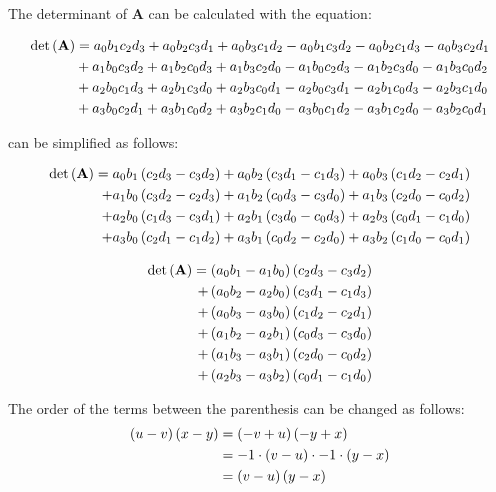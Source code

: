 The determinant of $\mathbf{A}$ can be calculated with the equation:

\begin{align}
\mathrm{det}\left(\mathbf{A}\right)
&
= a_0b_1c_2d_3 
+ a_0b_2c_3d_1 
+ a_0b_3c_1d_2
- a_0b_1c_3d_2
- a_0b_2c_1d_3 
- a_0b_3c_2d_1\nonumber\\
&
+ a_1b_0c_3d_2
+ a_1b_2c_0d_3
+ a_1b_3c_2d_0
- a_1b_0c_2d_3
- a_1b_2c_3d_0
- a_1b_3c_0d_2\nonumber\\
&
+ a_2b_0c_1d_3
+ a_2b_1c_3d_0
+ a_2b_3c_0d_1
- a_2b_0c_3d_1
- a_2b_1c_0d_3
- a_2b_3c_1d_0\nonumber\\
&
+ a_3b_0c_2d_1
+ a_3b_1c_0d_2
+ a_3b_2c_1d_0
- a_3b_0c_1d_2
- a_3b_1c_2d_0
- a_3b_2c_0d_1\label{eq:determinant4x4}
\end{align}

 can be simplified as follows:

\begin{align*}
\mathrm{det}\left(\mathbf{A}\right)
= a_0b_1 \left(c_2d_3 - c_3d_2\right) 
+ a_0b_2 \left(c_3d_1 - c_1d_3\right)
+ a_0b_3 \left(c_1d_2 - c_2d_1\right)\\
+ a_1b_0 \left(c_3d_2 - c_2d_3\right)
+ a_1b_2 \left(c_0d_3 - c_3d_0\right)
+ a_1b_3 \left(c_2d_0 - c_0d_2\right)\\
+ a_2b_0 \left(c_1d_3 - c_3d_1\right)
+ a_2b_1 \left(c_3d_0 - c_0d_3\right)
+ a_2b_3 \left(c_0d_1 - c_1d_0\right)\\
+ a_3b_0 \left(c_2d_1 - c_1d_2\right)
+ a_3b_1 \left(c_0d_2 - c_2d_0\right)
+ a_3b_2 \left(c_1d_0 - c_0d_1\right)
\end{align*}




\begin{align*}
\mathrm{det}\left(\mathbf{A}\right)
= \left(a_0b_1 - a_1b_0\right) \left(c_2d_3 - c_3d_2\right)\\
+ \left(a_0b_2 - a_2b_0\right) \left(c_3d_1 - c_1d_3\right)\\
+ \left(a_0b_3 - a_3b_0\right) \left(c_1d_2 - c_2d_1\right)\\
+ \left(a_1b_2 - a_2b_1\right) \left(c_0d_3 - c_3d_0\right)\\
+ \left(a_1b_3 - a_3b_1\right) \left(c_2d_0 - c_0d_2\right)\\
+ \left(a_2b_3 - a_3b_2\right) \left(c_0d_1 - c_1d_0\right)\\
\end{align*}

The order of the terms between the parenthesis can be changed as follows:
\begin{align*}
\left(u-v\right)\left(x-y\right) 
&= \left(-v+u\right)\left(-y+x\right)\\
&= -1\cdot\left(v-u\right)\cdot -1 \cdot \left(y-x\right) \\
&= \left(v-u\right)\left(y-x\right) 
\end{align*} 

